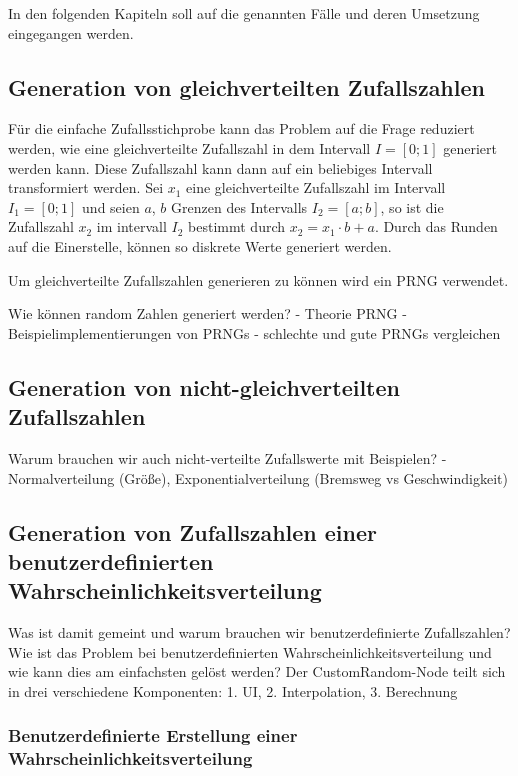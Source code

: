 In den folgenden Kapiteln soll auf die genannten Fälle und deren Umsetzung eingegangen werden.

\subsection{Generation von gleichverteilten Zufallszahlen}

Für die einfache Zufallsstichprobe kann das Problem auf die Frage reduziert werden, wie eine gleichverteilte Zufallszahl in dem Intervall $I=[0;1]$ generiert werden kann. Diese Zufallszahl kann dann auf ein beliebiges Intervall transformiert werden. Sei $x_1$ eine gleichverteilte Zufallszahl im Intervall $I_1=[0;1]$ und seien $a$, $b$ Grenzen des Intervalls $I_2=[a;b]$, so ist die Zufallszahl $x_2$ im intervall $I_2$ bestimmt durch $x_2=x_1 \cdot b+a$. Durch das Runden auf die Einerstelle, können so diskrete Werte generiert werden.

Um gleichverteilte Zufallszahlen generieren zu können wird ein \ac{PRNG} verwendet.

Wie können random Zahlen generiert werden? 
- Theorie PRNG
- Beispielimplementierungen von PRNGs
- schlechte und gute PRNGs vergleichen

\subsection{Generation von nicht-gleichverteilten Zufallszahlen}

Warum brauchen wir auch nicht-verteilte Zufallswerte mit Beispielen?
- Normalverteilung (Größe), Exponentialverteilung (Bremsweg vs Geschwindigkeit)

\subsection{Generation von Zufallszahlen einer benutzerdefinierten Wahrscheinlichkeitsverteilung}

Was ist damit gemeint und warum brauchen wir benutzerdefinierte Zufallszahlen?
Wie ist das Problem bei benutzerdefinierten Wahrscheinlichkeitsverteilung und wie kann dies am einfachsten gelöst werden?
Der CustomRandom-Node teilt sich in drei verschiedene Komponenten: 1. UI, 2. Interpolation, 3. Berechnung

\subsubsection{Benutzerdefinierte Erstellung einer Wahrscheinlichkeitsverteilung}

